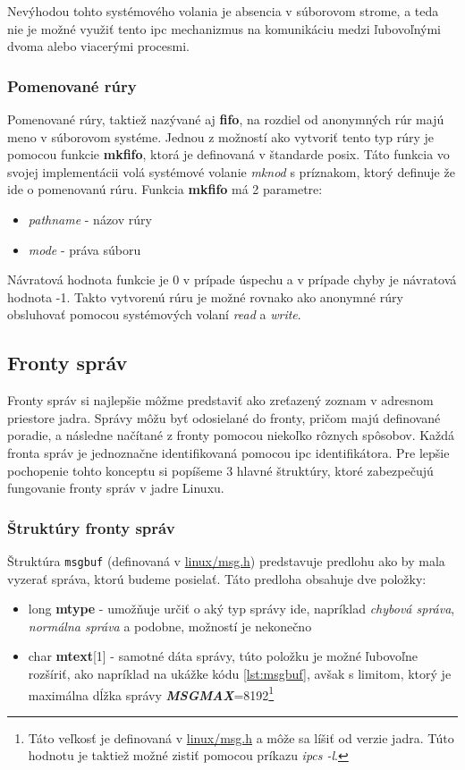 Nevýhodou tohto systémového volania je absencia v súborovom strome, a teda nie je možné využiť tento \acrshort{ipc} mechanizmus na komunikáciu medzi ľubovoľnými dvoma alebo viacerými procesmi.\cite{overview}
\subsubsection{Pomenované rúry}
Pomenované rúry, taktiež nazývané aj \textbf{\acrshort{fifo}}, na rozdiel od anonymných rúr majú meno v súborovom systéme. Jednou z možností ako vytvoriť tento typ rúry je pomocou funkcie \textbf{mkfifo}, ktorá je definovaná v štandarde \acrshort{posix}. Táto funkcia vo svojej implementácii volá systémové volanie \textit{mknod} s príznakom, ktorý definuje že ide o pomenovanú rúru. Funkcia \textbf{mkfifo} má 2 parametre:
\begin{itemize}
\item \textit{pathname} - názov rúry
\item \textit{mode} - práva súboru 
\end{itemize}
Návratová hodnota funkcie je 0 v prípade úspechu a v prípade chyby je návratová hodnota -1. Takto vytvorenú rúru je možné rovnako ako anonymné rúry obsluhovať pomocou systémových volaní \textit{read} a \textit{write}.\cite{mkfifo}

\subsection{Fronty správ}
Fronty správ si najlepšie môžme predstaviť ako zreťazený zoznam v adresnom priestore jadra. Správy môžu byť odosielané do fronty, pričom majú definované poradie, a následne načítané z fronty pomocou niekoľko rôznych spôsobov. Každá fronta správ je jednoznačne identifikovaná pomocou \acrshort{ipc} identifikátora. Pre lepšie pochopenie tohto konceptu si popíšeme 3 hlavné štruktúry, ktoré zabezpečujú fungovanie fronty správ v jadre Linuxu.\cite{guide}
\subsubsection{Štruktúry fronty správ} \label{msgstruct}
Štruktúra \texttt{msgbuf} (definovaná v \url{linux/msg.h}) predstavuje predlohu ako by mala vyzerať správa, ktorú budeme posielať. Táto predloha obsahuje dve položky: 
\begin{itemize}
\item long \textbf{mtype} - umožňuje určiť o aký typ správy ide, napríklad \textit{chybová správa}, \textit{normálna správa} a podobne, možností je nekonečno
\item char \textbf{mtext}[1] - samotné dáta správy, túto položku je možné ľubovoľne rozšíriť, ako napríklad na ukážke kódu \ref{lst:msgbuf}, avšak s limitom, ktorý je maximálna dĺžka správy \textit{\textbf{MSGMAX}}=8192\footnote{Táto veľkosť je definovaná v \url{linux/msg.h} a môže sa líšiť od verzie jadra. Túto hodnotu je taktiež možné zistiť pomocou príkazu \textit{ipcs -l}.}
\end{itemize}

